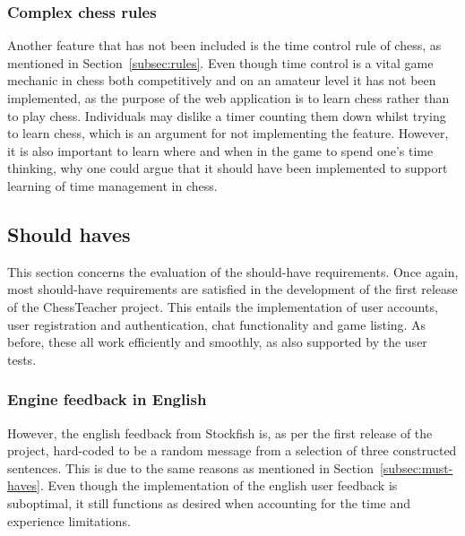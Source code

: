 \subsubsection{Complex chess rules}

Another feature that has not been included is the time control rule of chess, as mentioned in
Section~\ref{subsec:rules}.
Even though time control is a vital game mechanic in chess both competitively and on an amateur level it has not been
implemented, as the purpose of the web application is to learn chess rather than to play chess.
Individuals may dislike a timer counting them down whilst trying to learn chess, which is an argument for not
implementing the feature.
However, it is also important to learn where and when in the game to spend one's time thinking, why one could argue that
it should have been implemented to support learning of time management in chess.

\subsection{Should haves}\label{subsec:should-haves}

This section concerns the evaluation of the should-have requirements.
Once again, most should-have requirements are satisfied in the development of the first release of the ChessTeacher
project.
This entails the implementation of user accounts, user registration and authentication, chat functionality and game
listing.
As before, these all work efficiently and smoothly, as also supported by the user tests.

\subsubsection{Engine feedback in English}

However, the english feedback from Stockfish is, as per the first release of the project, hard-coded to be a random
message from a selection of three constructed sentences.
This is due to the same reasons as mentioned in Section~\ref{subsec:must-haves}.
Even though the implementation of the english user feedback is suboptimal, it still functions as desired when accounting
for the time and experience limitations.
